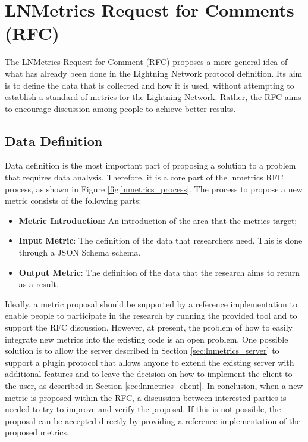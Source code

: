 \section{LNMetrics Request for Comments (RFC)}

The LNMetrics Request for Comment (RFC) proposes a more general idea of what has 
already been done in the Lightning Network protocol definition. Its aim is to define
the data that is collected and how it is used, without attempting to establish a standard
of metrics for the Lightning Network. Rather, the RFC aims to encourage discussion
among people to achieve better results.

\subsection{Data Definition}
\label{sec:data_definition}

Data definition is the most important part of proposing a solution to a 
problem that requires data analysis. Therefore, it is a core part of the 
lnmetrics RFC process, as shown in Figure \ref{fig:lnmetrics_process}. The 
process to propose a new metric consists of the following parts:

\begin{itemize}
    \item \textbf{Metric Introduction}: An introduction of the area that the metrics target;
    \item \textbf{Input Metric}: The definition of the data that researchers need. This is done through a JSON Schema schema.
    \item \textbf{Output Metric}: The definition of the data that the research aims to return as a result.
\end{itemize}

Ideally, a metric proposal should be supported by a reference implementation 
to enable people to participate in the research by running the provided tool and
to support the RFC discussion. However, at present, the problem of how to easily 
integrate new metrics into the existing code is an open problem. One possible 
solution is to allow the server described in Section \ref{sec:lnmetrics_server} 
to support a plugin protocol that allows anyone to extend the existing server 
with additional features and to leave the decision on how to implement the client 
to the user, as described in Section \ref{sec:lnmetrics_client}. In conclusion, 
when a new metric is proposed within the RFC, a discussion between interested 
parties is needed to try to improve and verify the proposal. If this is not 
possible, the proposal can be accepted directly by providing a reference 
implementation of the proposed metrics.


